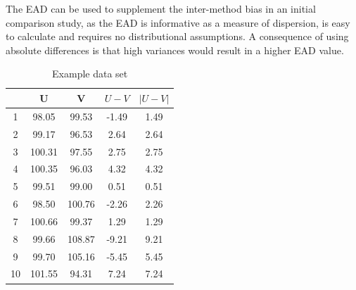 \documentclass[12pt, a4paper]{report}
\theoremstyle{plain}
\theoremstyle{definition}
\theoremstyle{remark}
\begin{document}
	The EAD can be used to supplement the inter-method bias in an
	initial comparison study, as the EAD is informative as a measure
	of dispersion, is easy to calculate and requires no distributional
	assumptions. A consequence of using absolute differences is that high variances would result in a higher EAD value. 
	
	
	
	
	
	\begin{table}[ht]
		\centering
		\begin{tabular}{|c|c|c|c|c|}
			\hline
			& U & V & $U-V$ & $|U-V|$ \\ 
			\hline
			1 & 98.05 & 99.53 & -1.49 & 1.49 \\ 
			2 & 99.17 & 96.53 & 2.64 & 2.64 \\ 
			3 & 100.31 & 97.55 & 2.75 & 2.75 \\ 
			4 & 100.35 & 96.03 & 4.32 & 4.32 \\ 
			5 & 99.51 & 99.00 & 0.51 & 0.51 \\ 
			6 & 98.50 & 100.76 & -2.26 & 2.26 \\ 
			7 & 100.66 & 99.37 & 1.29 & 1.29 \\ 
			8 & 99.66 & 108.87 & -9.21 & 9.21 \\ 
			9 & 99.70 & 105.16 & -5.45 & 5.45 \\ 
			10 & 101.55 & 94.31 & 7.24 & 7.24 \\ 
			\hline
		\end{tabular}
		\caption{Example data set}
		\label{EADdata}
	\end{table}
	
\end{document}
